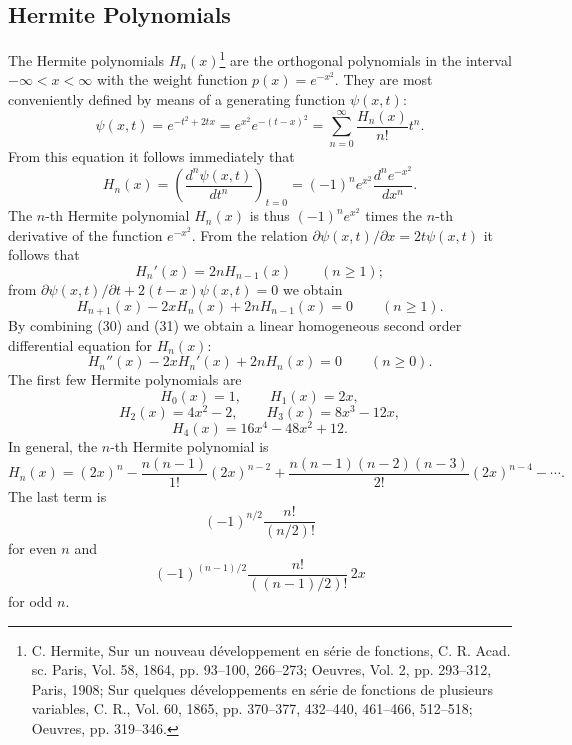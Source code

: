 \subsection{Hermite Polynomials}
The Hermite polynomials $H_n(x)$\footnote{C. Hermite, Sur un nouveau d\'eveloppement en s\'erie de fonctions, C. R. Acad. sc. Paris, Vol. 58, 1864, pp. 93--100, 266--273; Oeuvres, Vol. 2, pp. 293--312, Paris, 1908; Sur quelques d\'eveloppements en s\'erie de fonctions de plusieurs variables, C. R., Vol. 60, 1865, pp. 370--377, 432--440, 461--466, 512--518; Oeuvres, pp. 319--346.} are the orthogonal polynomials in the interval $-\infty<x<\infty$ with the weight function $p(x)=e^{-x^2}$. They are most conveniently defined by means of a generating function $\psi(x,t)$:
\begin{equation}
\psi(x,t)=e^{-t^2+2tx}=e^{x^2}e^{-(t-x)^2}
=\sum_{n=0}^{\infty}\frac{H_n(x)}{n!}t^n.
\tag{28}
\end{equation}
From this equation it follows immediately that
\begin{equation}
H_n(x)=\left(\frac{d^n\psi(x,t)}{dt^n}\right)_{t=0}
=(-1)^ne^{x^2}\frac{d^ne^{-x^2}}{dx^n}.
\tag{29}
\end{equation}
The $n$-th Hermite polynomial $H_n(x)$ is thus $(-1)^ne^{x^2}$ times the $n$-th derivative of the function $e^{-x^2}$. From the relation $\partial\psi(x,t)/\partial x=2t\psi(x,t)$ it follows that
\begin{equation}
H_n'(x)=2nH_{n-1}(x)\qquad(n\ge1);
\tag{30}
\end{equation}
from $\partial\psi(x,t)/\partial t+2(t-x)\psi(x,t)=0$ we obtain
\begin{equation}
H_{n+1}(x)-2xH_n(x)+2nH_{n-1}(x)=0\qquad(n\ge1).
\tag{31}
\end{equation}
By combining (30) and (31) we obtain a linear homogeneous second order differential equation for $H_n(x)$:
\begin{equation}
H_n''(x)-2xH_n'(x)+2nH_n(x)=0\qquad(n\ge0).
\tag{32}
\end{equation}
The first few Hermite polynomials are
\[
H_0(x)=1,\qquad H_1(x)=2x,
\]
\[
H_2(x)=4x^2-2,\qquad H_3(x)=8x^3-12x,
\]
\[
H_4(x)=16x^4-48x^2+12.
\]
In general, the $n$-th Hermite polynomial is
\[
H_n(x)=(2x)^n-\frac{n(n-1)}{1!}(2x)^{n-2}
+\frac{n(n-1)(n-2)(n-3)}{2!}(2x)^{n-4}-\cdots.
\]
The last term is
\[
(-1)^{n/2}\frac{n!}{(n/2)!}
\]
for even $n$ and
\[
(-1)^{(n-1)/2}\frac{n!}{((n-1)/2)!}\,2x
\]
for odd $n$.

